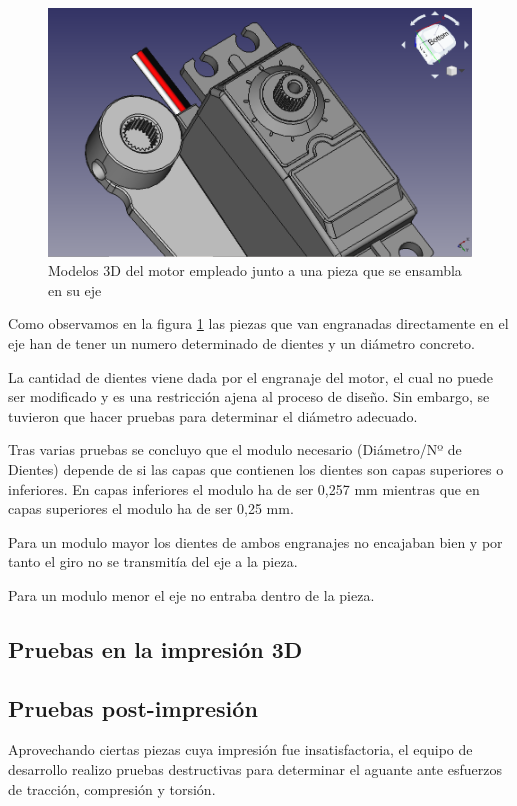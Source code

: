\begin{figure}[H]
    \centering
    \includegraphics[width=.7\linewidth]{pictures/ComparativaEngranajes.png}
    \caption{Modelos 3D del motor empleado junto a una pieza que se ensambla en su eje}
    \label{fig:comparativa_engranajes}
\end{figure}

Como observamos en la figura \ref{fig:comparativa_engranajes} las piezas que van engranadas directamente en el eje han de tener un numero determinado de dientes y un diámetro concreto.

La cantidad de dientes viene dada por el engranaje del motor, el cual no puede ser modificado y es una restricción ajena al proceso de diseño. Sin embargo, se tuvieron que hacer pruebas para determinar el diámetro adecuado.

Tras varias pruebas se concluyo que el modulo necesario (Diámetro/Nº de Dientes) depende de si las capas que contienen los dientes son capas superiores o inferiores.
En capas inferiores el modulo ha de ser 0,257 mm mientras que en capas superiores el modulo ha de ser 0,25 mm.

Para un modulo mayor los dientes de ambos engranajes no encajaban bien y por tanto el giro no se transmitía del eje a la pieza.

Para un modulo menor el eje no entraba dentro de la pieza.

\subsection{Pruebas en la impresión 3D}


\subsection{Pruebas post-impresión}

Aprovechando ciertas piezas cuya impresión fue insatisfactoria, el equipo de desarrollo realizo pruebas destructivas para determinar el aguante ante esfuerzos de tracción, compresión y torsión.

